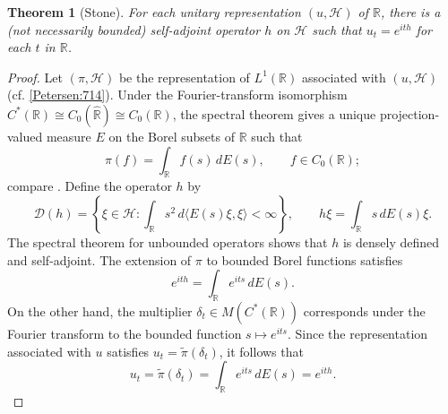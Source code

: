 \documentclass{book}
\newtheorem{theorem}[definition]{Theorem}
\begin{document}
\begin{theorem}[Stone]\label{Petersen:717}
  For each unitary representation \((u,\mathcal{H})\) of \(\mathbb{R}\), there is a 
  (not necessarily bounded) self-adjoint operator \(h\) on \(\mathcal{H}\) such that \(u_t=e^{ith}\) for each \(t\) in \(\mathbb{R}\).
\end{theorem}
\begin{proof}
  Let \((\pi,\mathcal{H})\) be the representation of \(L^1(\mathbb{R})\) associated with \((u,\mathcal{H})\) (cf.
  \ref{Petersen:714}). Under the Fourier-transform isomorphism
  \(C^*(\mathbb R)\cong C_0(\hat{\mathbb R})\cong C_0(\mathbb R)\), the spectral
  theorem gives a unique projection-valued measure \(E\) on the Borel subsets
  of \(\mathbb R\) such that
  \[
    \pi(f)=\int_{\mathbb R}f(s)\,dE(s),
    \qquad f\in C_0(\mathbb R);
  \]
  compare \cite[Proposition~8.3.2]{PGK79}. Define the operator \(h\) by
  \[
    \mathcal D(h)
    =
    \left\{\xi\in\mathcal H:
      \int_{\mathbb R}s^2\,d\langle E(s)\xi,\xi\rangle<\infty
    \right\},
    \qquad
    h\xi=\int_{\mathbb R}s\,dE(s)\xi.
  \]
  The spectral theorem for unbounded operators shows that \(h\) is densely
  defined and self-adjoint. The extension of \(\pi\) to bounded Borel
  functions satisfies
  \[
    e^{ith}=\int_{\mathbb R}e^{its}\,dE(s).
  \]
  On the other hand, the multiplier \(\delta_t\in M(C^*(\mathbb R))\)
  corresponds under the Fourier transform to the bounded function
  \(s\mapsto e^{its}\). Since the representation associated with \(u\)
  satisfies \(u_t=\widetilde\pi(\delta_t)\), it follows that
  \[
    u_t
    =\widetilde\pi(\delta_t)
    =\int_{\mathbb R}e^{its}\,dE(s)
    =e^{ith}.
  \]
\end{proof}
\end{document}
